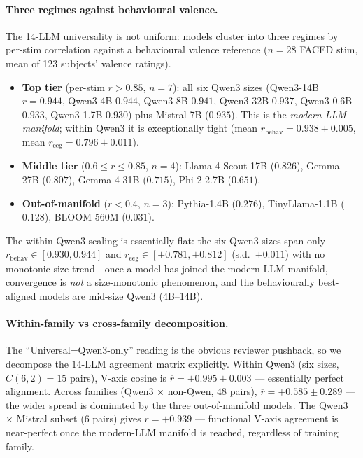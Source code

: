 \paragraph{Three regimes against behavioural valence.}

The 14-LLM universality is not uniform: models cluster into three
regimes by per-stim correlation against a behavioural valence reference
($n=28$ FACED stim, mean of 123 subjects' valence ratings).

\begin{itemize}
\item \textbf{Top tier} (per-stim $r > 0.85$, $n=7$): all six Qwen3
sizes (Qwen3-14B $r=0.944$, Qwen3-4B $0.944$, Qwen3-8B $0.941$,
Qwen3-32B $0.937$, Qwen3-0.6B $0.933$, Qwen3-1.7B $0.930$) plus
Mistral-7B ($0.935$). This is the \emph{modern-LLM manifold}; within
Qwen3 it is exceptionally tight (mean $r_{\mathrm{behav}}=0.938 \pm
0.005$, mean $r_{\mathrm{eeg}}=0.796 \pm 0.011$).
\item \textbf{Middle tier} ($0.6 \leq r \leq 0.85$, $n=4$):
Llama-4-Scout-17B ($0.826$), Gemma-27B ($0.807$), Gemma-4-31B
($0.715$), Phi-2-2.7B ($0.651$).
\item \textbf{Out-of-manifold} ($r < 0.4$, $n=3$): Pythia-1.4B ($0.276$),
TinyLlama-1.1B ($0.128$), BLOOM-560M ($0.031$).
\end{itemize}

The within-Qwen3 scaling is essentially flat: the six Qwen3 sizes span
only $r_{\mathrm{behav}}\in[0.930, 0.944]$ and
$r_{\mathrm{eeg}}\in[+0.781, +0.812]$ (s.d.\ $\pm 0.011$) with no
monotonic size trend---once a model has joined the modern-LLM manifold,
convergence is \emph{not} a size-monotonic phenomenon, and the
behaviourally best-aligned models are mid-size Qwen3 (4B--14B).

\paragraph{Within-family vs cross-family decomposition.} The
``Universal=Qwen3-only'' reading is the obvious reviewer pushback,
so we decompose the $14$-LLM agreement matrix explicitly. Within
Qwen3 (six sizes, $C(6,2)=15$ pairs), V-axis cosine is
$\overline{r}=+0.995 \pm 0.003$ --- essentially perfect alignment.
Across families (Qwen3 $\times$ non-Qwen, $48$ pairs),
$\overline{r}=+0.585 \pm 0.289$ --- the wider spread is dominated by
the three out-of-manifold models. The Qwen3 $\times$ Mistral subset
($6$ pairs) gives $\overline{r}=+0.939$ --- functional V-axis agreement is
near-perfect once the modern-LLM manifold is reached, regardless of
training family.


